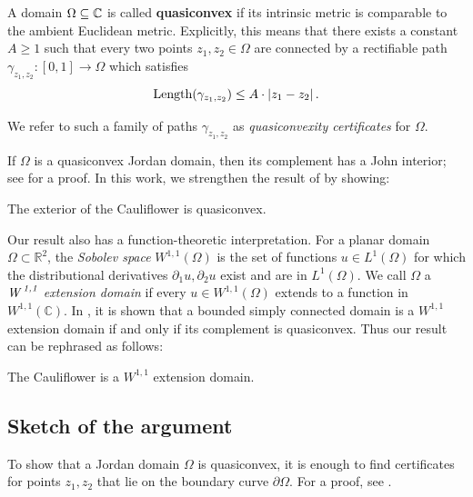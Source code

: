 A domain $\Omega\subseteq\mathbb{C}$ is called \textbf{quasiconvex} 
if its intrinsic metric is comparable to the ambient Euclidean metric. 
Explicitly, this means that there exists a constant $A\geq1$ such that every two points $z_{1},z_{2}\in\Omega$
 are connected by a rectifiable path $\gamma_{z_1,z_2}:\left[0,1\right]\to\Omega$ which satisfies
\begin{equation}
\operatorname{Length}(\gamma_{z_1,z_2})\leq A\cdot\left|z_{1}-z_{2}\right|.	
\end{equation}

We refer to such a family of paths $\gamma_{z_1,z_2}$ as \emph{quasiconvexity certificates} for $\Omega$.

If $\Omega$ is a quasiconvex Jordan domain, then its complement has a John interior; see \cite[Corollary 3.4]{hakobyan_euclidean_2008} for a proof.
In this work, we strengthen the result of \cite[Theorem 6.1]{carleson_julia_1994} by showing:

\begin{theorem}
The exterior of the Cauliflower is quasiconvex.
\end{theorem}




Our result also has a function-theoretic interpretation. 
For a planar domain $\Omega \subset \mathbb R ^2$,
the \emph{Sobolev space} $W^{1,1}(\Omega)$ 
 is the set of functions $u \in L^1(\Omega)$ for which 
 the distributional derivatives $\partial_1 u, \partial_2 u$ exist and are in $L^1(\Omega)$.
We call $\Omega$ a 
\emph{$\textit{W}^\textit{\;1,1}$ extension domain}
 if every 
$u \in W^{1,1}(\Omega)$ extends to a function
in $W^{1,1}(\mathbb{C})$.
In \cite[Equation (1.1) and Theorem 1.4]{strong_bv_extension_2022}, 
it is shown that a bounded simply connected domain
is a $W^{1,1}$ extension domain if and only if its complement is quasiconvex.
Thus our result can be rephrased as follows:


 \begin{theorem}
 The Cauliflower is a $W^{1,1}$ extension domain.
 \end{theorem}
 
\subsection{Sketch of the argument}
To show that a Jordan domain $\Omega$ is quasiconvex, it is enough to find certificates for points $z_{1},z_{2}$ that lie
on the boundary curve $\partial\Omega$. For a proof, see \cite[Corollary F]{hakobyan_euclidean_2008}.

